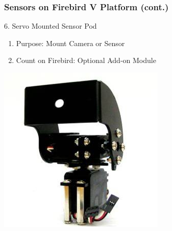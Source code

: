 \documentclass[10pt,red]{beamer}
\begin{document}
\begin{frame}
	\frametitle{Sensors on Firebird V Platform (cont.)} 
	6. Servo Mounted Sensor Pod	\pause
		\vfill
		\begin{minipage}[c]{0.5\textwidth}
			\begin{enumerate}
				\item <+-|alert@+> Purpose: Mount Camera or Sensor 
				\item <+-|alert@+> Count on Firebird: Optional Add-on Module
			\end{enumerate}
		\end{minipage}
		\hfill
		\begin{minipage}[c]{0.4\textwidth}
			\includegraphics[width=\linewidth]{servo_pod}
		\end{minipage}	
\end{frame}		
\end{document}
